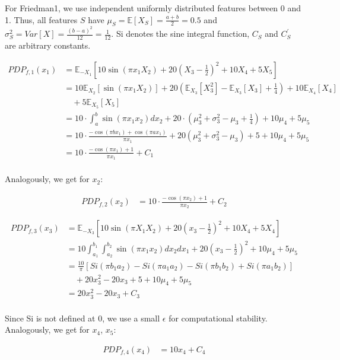 \documentclass[runningheads]{llncs}
\begin{document}
For Friedman1, we use independent uniformly distributed features between 0
and 1. Thus, all features $S$ have $\mu_S = \mathbb{E}[X_S]=\frac{a+b}{2}=0.5$ and
$\sigma_S^2 = Var[X]=\frac{(b-a)^2}{12}=\frac{1}{12}$.
Si denotes the sine integral function, $C_S$ and $C_S^\prime$ are arbitrary constants.

\begin{align*}
    PDP_{f,1}(x_1) &= \mathbb{E}_{-X_1}[10\sin(\pi x_1X_2) + 20(X_3-\frac{1}{2})^2 + 10X_4 + 5X_5] \\
    &= 10 \mathbb{E}_{X_2}[\sin(\pi x_1X_2)] + 20(\mathbb{E}_{X_3}[X_3^2] - \mathbb{E}_{X_3}[X_3] + \frac{1}{4}) + 10 \mathbb{E}_{X_4}[X_4] \\
    &\quad + 5 \mathbb{E}_{X_5}[X_5]\\
    &= 10 \cdot \int_{a}^{b} \sin(\pi x_1x_2)dx_2 + 20\cdot(\mu_3^2 + \sigma_3^2 - \mu_3 + \frac{1}{4}) + 10\mu_4 + 5\mu_5 \\
    &= 10 \cdot \frac{-\cos(\pi bx_1) + \cos(\pi ax_1)}{\pi x_1} + 20(\mu_3^2 + \sigma_3^2 - \mu_3) + 5 + 10\mu_4 + 5\mu_5 \\
    &= 10 \cdot \frac{-\cos(\pi x_1) + 1}{\pi x_1} + C_1 \\
\end{align*}

\noindent Analogously, we get for $x_2$:

\begin{align*}
    PDP_{f,2}(x_2) &= 10 \cdot \frac{-\cos(\pi x_2) + 1}{\pi x_2} + C_2
\end{align*}
    
\begin{align*}
    PDP_{f,3}(x_3) &= \mathbb{E}_{-X_3}[10\sin(\pi X_1X_2) + 20(x_3-\frac{1}{2})^2 + 10X_4 + 5X_4] \\
    &= 10\int_{a_1}^{b_1}\int_{a_2}^{b_2}\sin(\pi x_1x_2)dx_2dx_1 + 20(x_3-\frac{1}{2})^2 + 10\mu_4 + 5\mu_5 \\
    &= \frac{10}{\pi}[Si(\pi b_1a_2) - Si(\pi a_1a_2) - Si(\pi b_1b_2) + Si(\pi a_1b_2)] \\
    &\quad + 20x_3^2 - 20x_3 + 5 + 10\mu_4 + 5\mu_5 \\
    &= 20x_3^2 - 20x_3 + C_3 \\
\end{align*}

\noindent Since Si is not defined at 0, we use a small $\epsilon$ for
computational stability.\newline
Analogously, we get for $x_4$, $x_5$:

\begin{align*}
    PDP_{f,4}(x_4) &= 10x_4 + C_4
\end{align*}
\end{document}
